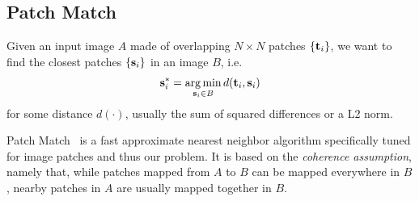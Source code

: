 
\subsection{Patch Match}

Given an input image $A$ made of overlapping $N\times N$ patches $\{\mathbf{t}_i\}$, we want to find the closest patches $\{\mathbf{s}_i\}$ in an image $B$, i.e.
\begin{equation}
	\mathbf{s}_i^{*} = \operatorname*{arg\,min}_{\mathbf{s}_i \in B} d(\mathbf{t}_i, \mathbf{s}_i)
\end{equation}
for some distance $d(\cdot)$, usually the sum of squared differences or a L2 norm.

Patch Match~\cite{Barnes09} is a fast approximate nearest neighbor algorithm specifically tuned for image patches and thus our problem.
It is based on the \emph{coherence assumption}, namely that, while patches mapped from $A$ to $B$ can be mapped everywhere in $B$, nearby patches in $A$ are usually mapped together in $B$.

